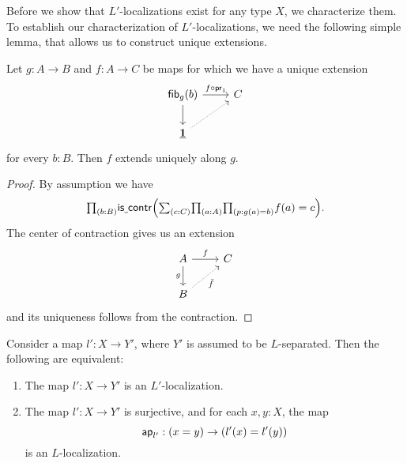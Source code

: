 Before we show that $L'$-localizations exist for any type $X$, we characterize them.
To establish our characterization of $L'$-localizations, we need the following simple lemma, that allows us to construct unique extensions.

\begin{lem}\label{lem:unique_extension}
Let $g:A\to B$ and $f:A\to C$ be maps for which we have a unique extension
\[
  \begin{tikzcd}
    \fib{g}{b} \arrow[r,"f\circ\proj 1"] \arrow[d] & C \\
    \unit \arrow[ur,densely dotted]
  \end{tikzcd}
\]
for every $b:B$.
Then $f$ extends uniquely along $g$.
\end{lem}

\begin{proof}
By assumption we have
\[
  \prd{b:B}\iscontr\Big(\sm{c:C}\prd{a:A}{p:g(a)=b} f(a)=c\Big).
\]
The center of contraction gives us an extension
\[
  \begin{tikzcd}
    A \arrow[r,"f"] \arrow[d,swap,"g"] & C \\
    B \arrow[ur,densely dotted,swap,"\tilde{f}"]
  \end{tikzcd}
\]
and its uniqueness follows from the contraction.
\end{proof}

\begin{thm}\label{thm:separation_characterization}
Consider a map $l':X\to Y'$, where $Y'$ is assumed to be $L$-separated. Then the following are equivalent:
\begin{enumerate}
\item The map $l':X\to Y'$ is an $L'$-localization.
\item The map $l':X\to Y'$ is surjective, and for each $x,y:X$, the map
\begin{equation*}
\mathsf{ap}_{l'}:(x=y)\to (l'(x)=l'(y))
\end{equation*}
is an $L$-localization. 
\end{enumerate}
\end{thm}

